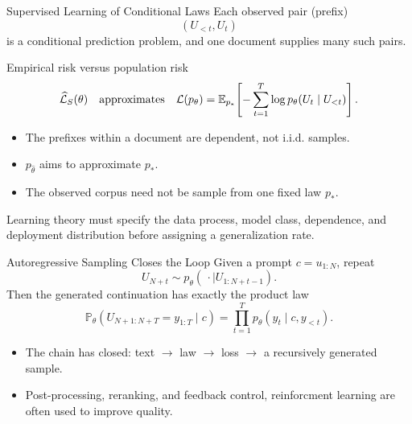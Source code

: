 \documentclass[aspectratio=169,11pt]{beamer}
\newcommand{\E}{\mathbb{E}}
\newcommand{\Pbb}{\mathbb{P}}
\begin{document}
\begin{frame}{Supervised Learning of Conditional Laws}
Each observed pair (prefix)
\[
  (U_{<t},U_t)
\]
is a conditional prediction problem, and one document supplies many such pairs.

\begin{block}{Empirical risk versus population risk}
\[
 \widehat{\mathcal L}_S(\theta)
 \quad\hbox{approximates}\quad
 \mathcal L(p_\theta)
 =\E_{p_*}\!\left[-\sum_{t=1}^T
     \log p_\theta(U_t\mid U_{<t})\right].
\]
\end{block}
\begin{itemize}
  \item  The prefixes within a document are dependent, not i.i.d. samples. 
  \item  $p_{\widehat \theta}$ aims to approximate $p_*$. 
  \item  The observed corpus need not be sample from one fixed law $p_*$. 
\end{itemize} 
Learning theory must specify the data process, model class, dependence, and
deployment distribution before assigning a generalization rate. 
\end{frame}

\begin{frame}{Autoregressive Sampling Closes the Loop}
Given a prompt $c=u_{1:N}$, repeat
\[
 U_{N+t}\sim p_\theta(\,\cdot\mid U_{1:N+t-1}).
\]
Then the generated continuation has exactly the product law
\[
 \Pbb_\theta(U_{N+1:N+T}=y_{1:T}\mid c)
 =\prod_{t=1}^T p_\theta(y_t\mid c,y_{<t}).
\]

\begin{itemize}
  \item The chain has closed: text $\to$ law $\to$ loss $\to$ a recursively generated sample. 
\item Post-processing, reranking, and feedback control, reinforcment learning are often used to improve quality. 
\end{itemize}

\end{frame}
\end{document}
